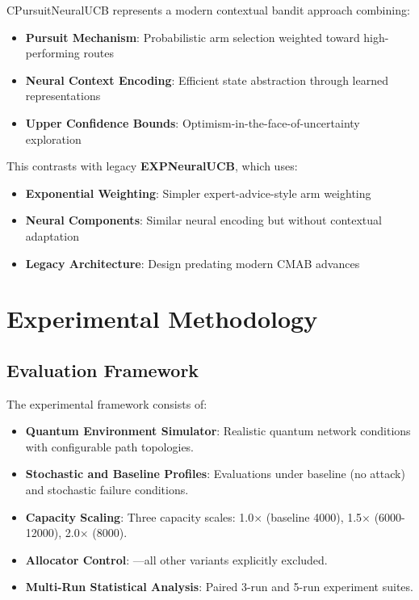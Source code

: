 \documentclass[12pt,a4paper]{article}
\newcommand{\legacy}[1]{\textcolor{legacycolor}{\textbf{#1}}}
\begin{document}
CPursuitNeuralUCB represents a modern contextual bandit approach combining:

\begin{itemize}
    \item \textbf{Pursuit Mechanism}: Probabilistic arm selection weighted toward high-performing routes
    \item \textbf{Neural Context Encoding}: Efficient state abstraction through learned representations
    \item \textbf{Upper Confidence Bounds}: Optimism-in-the-face-of-uncertainty exploration
\end{itemize}

This contrasts with legacy \legacy{EXPNeuralUCB}, which uses:

\begin{itemize}
    \item \textbf{Exponential Weighting}: Simpler expert-advice-style arm weighting
    \item \textbf{Neural Components}: Similar neural encoding but without contextual adaptation
    \item \textbf{Legacy Architecture}: Design predating modern CMAB advances
\end{itemize}

\section{Experimental Methodology}

\subsection{Evaluation Framework}

The experimental framework consists of:

\begin{itemize}
    \item \textbf{Quantum Environment Simulator}: Realistic quantum network conditions with configurable path topologies.
    \item \textbf{Stochastic and Baseline Profiles}: Evaluations under baseline (no attack) and stochastic failure conditions.
    \item \textbf{Capacity Scaling}: Three capacity scales: 1.0$\times$ (baseline 4000), 1.5$\times$ (6000-12000), 2.0$\times$ (8000).
    \item \textbf{Allocator Control}: —all other variants explicitly excluded.
    \item \textbf{Multi-Run Statistical Analysis}: Paired 3-run and 5-run experiment suites.
\end{itemize}
\end{document}
